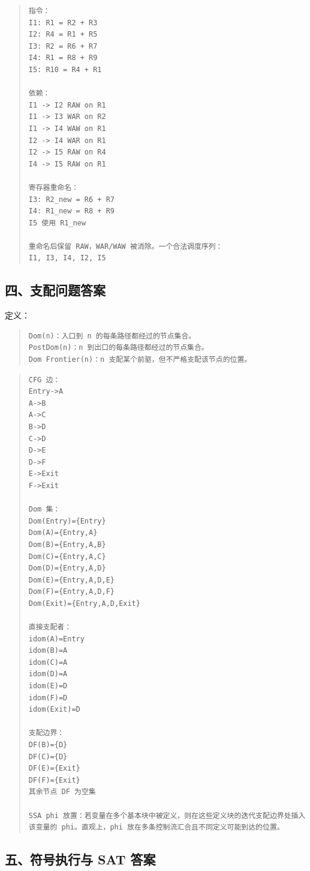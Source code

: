 \documentclass[UTF8,zihao=-4]{ctexart}
\begin{document}
\begin{quote}
\footnotesize
\begin{verbatim}
指令：
I1: R1 = R2 + R3
I2: R4 = R1 + R5
I3: R2 = R6 + R7
I4: R1 = R8 + R9
I5: R10 = R4 + R1

依赖：
I1 -> I2 RAW on R1
I1 -> I3 WAR on R2
I1 -> I4 WAW on R1
I2 -> I4 WAR on R1
I2 -> I5 RAW on R4
I4 -> I5 RAW on R1

寄存器重命名：
I3: R2_new = R6 + R7
I4: R1_new = R8 + R9
I5 使用 R1_new

重命名后保留 RAW，WAR/WAW 被消除。一个合法调度序列：
I1, I3, I4, I2, I5
\end{verbatim}
\end{quote}



\subsection{四、支配问题答案}


定义：


\begin{quote}
\footnotesize
\begin{verbatim}
Dom(n)：入口到 n 的每条路径都经过的节点集合。
PostDom(n)：n 到出口的每条路径都经过的节点集合。
Dom Frontier(n)：n 支配某个前驱，但不严格支配该节点的位置。
\end{verbatim}
\end{quote}


\begin{quote}
\footnotesize
\begin{verbatim}
CFG 边：
Entry->A
A->B
A->C
B->D
C->D
D->E
D->F
E->Exit
F->Exit

Dom 集：
Dom(Entry)={Entry}
Dom(A)={Entry,A}
Dom(B)={Entry,A,B}
Dom(C)={Entry,A,C}
Dom(D)={Entry,A,D}
Dom(E)={Entry,A,D,E}
Dom(F)={Entry,A,D,F}
Dom(Exit)={Entry,A,D,Exit}

直接支配者：
idom(A)=Entry
idom(B)=A
idom(C)=A
idom(D)=A
idom(E)=D
idom(F)=D
idom(Exit)=D

支配边界：
DF(B)={D}
DF(C)={D}
DF(E)={Exit}
DF(F)={Exit}
其余节点 DF 为空集

SSA phi 放置：若变量在多个基本块中被定义，则在这些定义块的迭代支配边界处插入该变量的 phi。直观上，phi 放在多条控制流汇合且不同定义可能到达的位置。
\end{verbatim}
\end{quote}



\subsection{五、符号执行与 SAT 答案}
\end{document}
